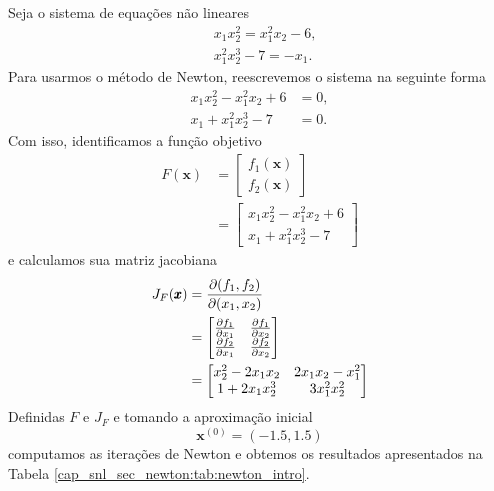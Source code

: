 \begin{ex}\label{cap_snl_sec_newton:ex:newton_intro}
  Seja o sistema de equações não lineares
  \begin{subequations}
    \begin{align}
      & x_1x_2^2 = x_1^2x_2 - 6,\\
      & x_1^2x_2^3 - 7 = -x_1.
    \end{align}
  \end{subequations}
  Para usarmos o método de Newton, reescrevemos o sistema na seguinte forma
  \begin{subequations}
    \begin{align}
      x_1x_2^2 - x_1^2x_2 + 6 &= 0,\\
      x_1 + x_1^2x_2^3 - 7 &= 0.
    \end{align}
\end{subequations}
  Com isso, identificamos a função objetivo
  \begin{align}
    F(\pmb{x}) &=
    \begin{bmatrix}
      f_1(\pmb{x})\\
      f_2(\pmb{x})
    \end{bmatrix}\\
    &=
    \begin{bmatrix}
      x_1x_2^2 - x_1^2x_2 + 6\\
      x_1 + x_1^2x_2^3 - 7
    \end{bmatrix}
  \end{align}
  e calculamos sua matriz jacobiana
  \begin{align}
    J_F(\pmb{x}) &= \frac{\partial(f_1, f_2)}{\partial(x_1, x_2)} \\
                 &=
                   \begin{bmatrix}
                     \frac{\partial f_1}{\partial x_1} & \frac{\partial f_1}{\partial x_2}\\
                     \frac{\partial f_2}{\partial x_1} & \frac{\partial f_2}{\partial x_2}\\
                   \end{bmatrix}\\
                 &=
                   \begin{bmatrix}
                     x_2^2 - 2x_1x_2 & 2x_1x_2-x_1^2\\
                     1+2x_1x_2^3 & 3x_1^2x_2^2
                   \end{bmatrix}
  \end{align}
  Definidas $F$ e $J_F$ e tomando a aproximação inicial
  \begin{equation}
    \pmb{x}^{(0)} = (-1.5, 1.5)
  \end{equation}
  computamos as iterações de Newton e obtemos os resultados apresentados na Tabela \ref{cap_snl_sec_newton:tab:newton_intro}.


\end{ex}
